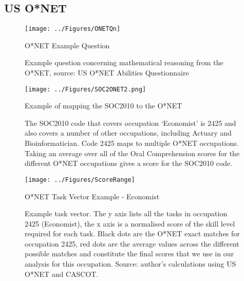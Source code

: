 \documentclass[11pt, oneside]{article}
\begin{document}
	\subsection{US O*NET}
	\label{sec:ONET}
	
	\begin{figure}[t]
		\centering
		\texttt{[image: ../Figures/ONETQn]}
		\caption{O*NET Example Question}
		\caption*{\small{Example question concerning mathematical reasoning from the O*NET, source: US O*NET Abilities Questionnaire}}
		\label{fig:ONETQn}
	\end{figure}
	
	\begin{figure}[h]
		\begin{center}
			\texttt{[image: ../Figures/SOC2ONET2.png]}
			\caption{Example of mapping the SOC2010 to the O*NET }
			\caption*{\small{The SOC2010 code that covers occupation `Economist' is 2425 and also covers a number of other occupations, including Actuary and Bioinformatician. Code 2425 maps to multiple O*NET occupations. Taking an average over all of the Oral Comprehension scores for the different O*NET occupations gives a score for the SOC2010 code. }}
			\label{fig:SOC2ONET}
		\end{center}
	\end{figure}
	
	
	\begin{figure}[h!]
		\centering
		\texttt{[image: ../Figures/ScoreRange]}
		\caption{O*NET Task Vector Example - Economist}
		\caption*{\small{Example task vector. The y axis lists all the tasks in occupation 2425 (Economist), the x axis is a normalised score of the skill level required for each task. Black dots are the O*NET exact matches for occupation 2425, red dots are the average values across the different possible matches and constitute the final scores that we use in our analysis for this occupation. Source: author's calculations using US O*NET and CASCOT.}}
		\label{fig:ONETScoreRange}
	\end{figure}
	
\end{document}

